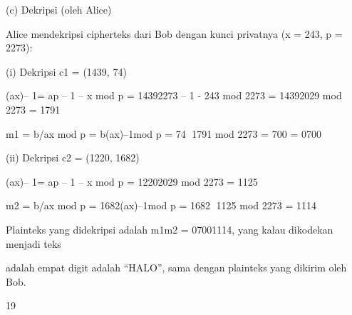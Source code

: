 \documentclass{article}
\begin{document}

(c) Dekripsi  (oleh Alice)

Alice mendekripsi cipherteks dari Bob dengan kunci privatnya (x = 243, p = 2273):

    (i) Dekripsi c1 = (1439, 74)

(ax)– 1= ap – 1 – x mod p = 14392273 – 1 - 243 mod 2273 = 14392029 mod 2273 = 1791

m1 = b/ax mod p = b(ax)–1mod p = 74 1791 mod 2273 = 700 = 0700

    (ii) Dekripsi c2 = (1220, 1682)

(ax)– 1= ap – 1 – x mod p = 12202029 mod 2273 = 1125

m2 = b/ax mod p = 1682(ax)–1mod p = 1682 1125 mod 2273 = 1114

Plainteks yang didekripsi adalah m1m2 = 07001114, yang kalau dikodekan menjadi teks 

adalah empat digit adalah “HALO”, sama dengan plainteks yang dikirim oleh Bob. 

19
\end{document}
